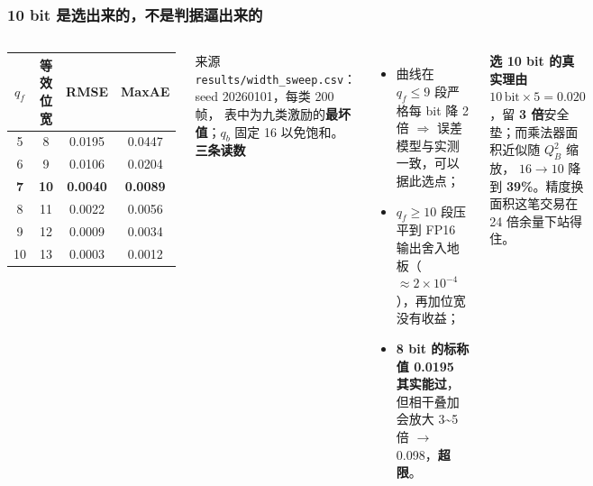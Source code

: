 \documentclass[10pt,aspectratio=43,mathserif]{beamer}
\begin{document}
\begin{frame}[t]
\frametitle{\textbf{10 bit 是选出来的，不是判据逼出来的}}
\begin{columns}[t,onlytextwidth]
  \scriptsize
  \begin{center}
  \setlength{\tabcolsep}{3pt}
  \begin{tabular}{@{}cccc@{}}
    \toprule
    $q_f$ & 等效位宽 & RMSE & MaxAE \\
    \midrule
    5 & 8  & 0.0195 & 0.0447 \\
    6 & 9  & 0.0106 & 0.0204 \\
    \textbf{7} & \textbf{10} & \textbf{0.0040} & \textbf{0.0089} \\
    8 & 11 & 0.0022 & 0.0056 \\
    9 & 12 & 0.0009 & 0.0034 \\
    10 & 13 & 0.0003 & 0.0012 \\
    \bottomrule
  \end{tabular}
  \end{center}
  \vspace{-1mm}
  {\tiny 来源 \texttt{results/width\_sweep.csv}：seed 20260101，每类 200 帧，
  表中为九类激励的\textbf{最坏值}；$q_b$ 固定 16 以免饱和。}
  \scriptsize
  \textbf{三条读数}
  \begin{itemize}
    \item 曲线在 $q_f\le9$ 段严格每 bit 降 2 倍 $\Rightarrow$ 误差模型与实测一致，可以据此选点；
    \item $q_f\ge10$ 段压平到 FP16 输出舍入地板（$\approx2\times10^{-4}$），再加位宽没有收益；
    \item \textbf{8 bit 的标称值 0.0195 其实能过}，但相干叠加会放大 3\textasciitilde5 倍 $\to$ 0.098，\textbf{超限}。
  \end{itemize}
  \vspace{0.5mm}
  \begin{block}{\textbf{\scriptsize 选 10 bit 的真实理由}}
    \scriptsize
    $10\,\text{bit}\times5=0.020$，留 \textbf{3 倍}安全垫；而乘法器面积近似随 $Q_B^2$ 缩放，
    $16\to10$ 降到 \textbf{39\%}。精度换面积这笔交易在 24 倍余量下站得住。
  \end{block}
\end{columns}
\end{frame}
\end{document}
